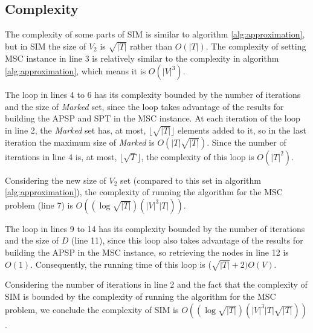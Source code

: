 \subsection{Complexity}

The complexity of some parts of SIM is similar to algorithm \ref{alg:approximation}, but in SIM the size of $V_2$ is $\sqrt{|T|}$ rather than $O(|T|)$. 
The complexity of setting MSC instance in line 3 is relatively similar to the complexity in algorithm \ref{alg:approximation}, which means 
it is $O(|V|^3)$.

The loop in lines 4 to 6 has its complexity bounded by the number of iterations and the size of \emph{Marked} set, since the loop takes 
advantage of the results for building the APSP and SPT in the MSC instance. At each iteration of the loop in line 2, the \emph{Marked} set has, 
at most, $\lfloor\sqrt{|T|}\rfloor$ elements added to it, so in the last iteration the maximum size of \emph{Marked} is $O(|T| \sqrt{|T|})$. Since the number of iterations 
in line 4 is, at most, $\lfloor\sqrt{T}\rfloor$, the complexity of this loop is $O(|T|^2)$.

Considering the new size of $V_2$ set (compared to this set in algorithm \ref{alg:approximation}), the complexity of running the algorithm for the MSC problem (line 7) is $O((\log \sqrt{|T|})(|V|^3|T|))$.

The loop in lines 9 to 14 has its complexity bounded by the number of iterations and the size of $D$ (line 11), since this loop also takes 
advantage of the results for building the APSP in the MSC instance, so retrieving the nodes in line 12 is $O(1)$. Consequently, the running time of 
this loop is ($\sqrt{|T|}+2) O(V)$.

Considering the number of iterations in line 2 and the fact that the complexity of SIM is bounded by the complexity of running the algorithm for the MSC problem, 
we conclude the complexity of SIM is $O((\log \sqrt{|T|})(|V|^3|T| \sqrt{|T|}))$.



